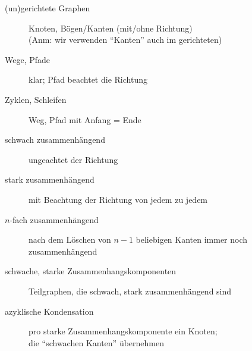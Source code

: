 \begin{description}
	\item[(un)gerichtete Graphen] Knoten, Bögen/Kanten (mit/ohne Richtung)\\(Anm: wir verwenden ``Kanten'' auch im gerichteten)
	\item[Wege, Pfade] klar; Pfad beachtet die Richtung
	\item[Zyklen, Schleifen] Weg, Pfad mit Anfang = Ende
	\item[schwach zusammenhängend] ungeachtet der Richtung
	\item[stark zusammenhängend] mit Beachtung der Richtung von jedem zu jedem
	\item[$n$-fach zusammenhängend] nach dem Löschen von $n\!-\!1$ beliebigen Kanten immer noch zusammenhängend
	\item[schwache, starke Zusammenhangskomponenten] Teilgraphen, die schwach, stark zusammenhängend sind
	\item[azyklische Kondensation] pro starke Zusammenhangskomponente ein Knoten;\\die ``schwachen Kanten'' übernehmen
\end{description}


